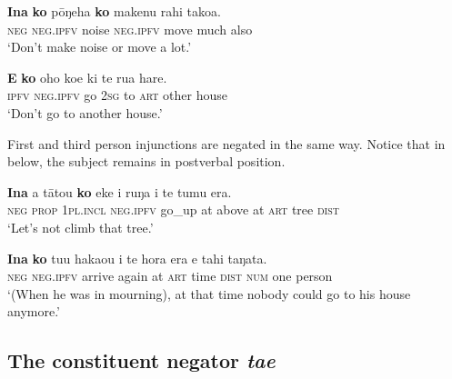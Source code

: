 \ea\label{ex:10.135}
\gll \textbf{{\ꞌ}Ina} \textbf{ko} pōŋeha \textbf{ko} makenu rahi tako{\ꞌ}a. \\
\textsc{neg} \textsc{neg.ipfv} noise \textsc{neg.ipfv} move much also \\

\glt 
‘Don’t make noise or move a lot.’ \textstyleExampleref{[R210.171]} 
\z

\ea\label{ex:10.136}
\gll \textbf{E} \textbf{ko} oho koe ki te rua hare. \\
\textsc{ipfv} \textsc{neg.ipfv} go \textsc{2sg} to \textsc{art} other house \\

\glt
‘Don’t go to another house.’ \textstyleExampleref{[R310.016]} 
\z

First and third person injunctions are negated in the same way. Notice that in  below, the subject remains in postverbal position.

\ea\label{ex:10.137}
\gll \textbf{{\ꞌ}Ina} a tātou \textbf{ko} eke {\ꞌ}i ruŋa i te tumu era. \\
\textsc{neg} \textsc{prop} \textsc{1pl.incl} \textsc{neg.ipfv} go\_up at above at \textsc{art} tree \textsc{dist} \\

\glt 
‘Let’s not climb that tree.’ \textstyleExampleref{[R481.044]} 
\z

\ea\label{ex:10.138}
\gll \textbf{{\ꞌ}Ina} \textbf{ko} tu{\ꞌ}u haka{\ꞌ}ou {\ꞌ}i te hora era e tahi taŋata. \\
\textsc{neg} \textsc{neg.ipfv} arrive again at \textsc{art} time \textsc{dist} \textsc{num} one person \\

\glt 
‘(When he was in mourning), at that time nobody could go to his house anymore.’ \textstyleExampleref{[R310.160]}\textstyleExampleref{} 
\z
{}
\subsection{The constituent negator \textit{ta{\ꞌ}e}}\label{sec:10.5.6}

